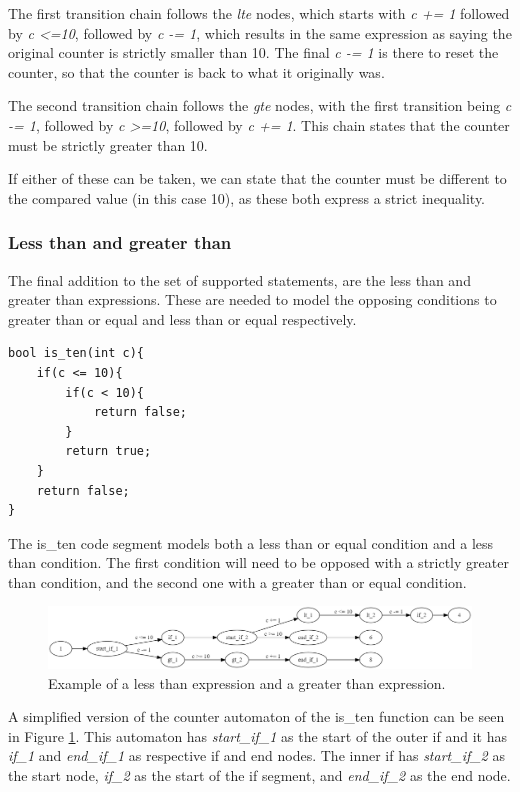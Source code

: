 \documentclass[12pt]{article}
\begin{document}
The first transition chain follows the \textit{lte} nodes, which starts with \textit{c += 1} followed by \textit{c \textless =10}, followed by \textit{c -= 1}, which results in the same expression as saying the original counter is strictly smaller than 10. The final \textit{c -= 1} is there to reset the counter, so that the counter is back to what it originally was. 

The second transition chain follows the \textit{gte} nodes, with the first transition being \textit{c -= 1}, followed by \textit{c \textgreater =10}, followed by \textit{c += 1}. This chain states that the counter must be strictly greater than 10.

If either of these can be taken, we can state that the counter must be different to the compared value (in this case 10), as these both express a strict inequality. 

\subsubsection{Less than and greater than}
\label{sec:strict}
The final addition to the set of supported statements, are the less than and greater than expressions. These are needed to model the opposing conditions to greater than or equal and less than or equal respectively.

\begin{lstlisting}[style=CStyle]
bool is_ten(int c){
	if(c <= 10){
		if(c < 10){
			return false;
		}
		return true;
	}
	return false;
}
\end{lstlisting}

The is\_ten code segment models both a less than or equal condition and a less than condition. The first condition will need to be opposed with a strictly greater than condition, and the second one with a greater than or equal condition.

\begin{figure}[h]
	\centering
	\includegraphics[width=\linewidth]{less_than_greater_than}
	\caption{Example of a less than expression and a greater than expression.}
	\label{fig:less_than_greater_than}
\end{figure}

A simplified version of the counter automaton of the is\_ten function can be seen in Figure \ref{fig:less_than_greater_than}. This automaton has \textit{start\_if\_1} as the start of the outer if and it has \textit{if\_1} and \textit{end\_if\_1} as respective if and end nodes. The inner if has \textit{start\_if\_2} as the start node, \textit{if\_2} as the start of the if segment, and \textit{end\_if\_2} as the end node.
\end{document}
